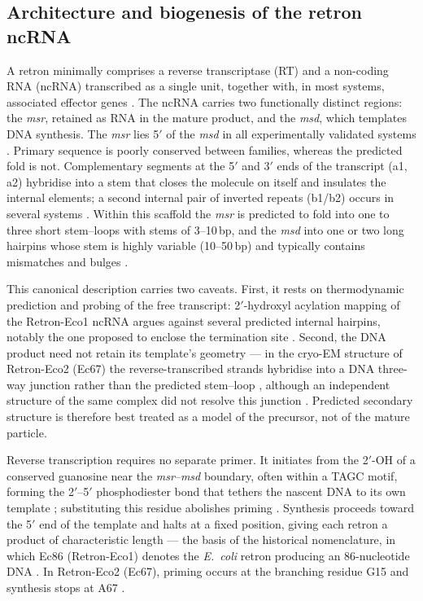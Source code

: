 \subsection{Architecture and biogenesis of the retron ncRNA}

A retron minimally comprises a reverse transcriptase (RT) and a non-coding RNA
(ncRNA) transcribed as a single unit, together with, in most systems, associated
effector genes \cite{simon2019,mestre2020,millman2020}. The ncRNA carries two
functionally distinct regions: the \textit{msr}, retained as RNA in the mature
product, and the \textit{msd}, which templates DNA synthesis. The \textit{msr}
lies 5$'$ of the \textit{msd} in all experimentally validated systems
\cite{lampson1989,simon2019}. Primary sequence is poorly conserved between
families, whereas the predicted fold is not. Complementary segments at the 5$'$
and 3$'$ ends of the transcript (a1, a2) hybridise into a stem that closes the
molecule on itself and insulates the internal elements; a second internal pair of
inverted repeats (b1/b2) occurs in several systems \cite{mestre2020,simon2019}.
Within this scaffold the \textit{msr} is predicted to fold into one to three short
stem--loops with stems of 3--10\,bp, and the \textit{msd} into one or two long
hairpins whose stem is highly variable (10--50\,bp) and typically contains
mismatches and bulges \cite{mestre2020}.

This canonical description carries two caveats. First, it rests on thermodynamic
prediction and probing of the free transcript: 2$'$-hydroxyl acylation mapping of
the Retron-Eco1 ncRNA argues against several predicted internal hairpins, notably
the one proposed to enclose the termination site \cite{palka2022}. Second, the DNA
product need not retain its template's geometry --- in the cryo-EM structure of
Retron-Eco2 (Ec67) the reverse-transcribed strands hybridise into a DNA three-way
junction rather than the predicted stem--loop \cite{jasnauskaite2026}, although an
independent structure of the same complex did not resolve this junction
\cite{wang2025}. Predicted secondary structure is therefore best treated as a
model of the precursor, not of the mature particle.

Reverse transcription requires no separate primer. It initiates from the 2$'$-OH
of a conserved guanosine near the \textit{msr}--\textit{msd} boundary, often within
a TAGC motif, forming the 2$'$--5$'$ phosphodiester bond that tethers the nascent
DNA to its own template \cite{lampson1989,simon2019}; substituting this residue
abolishes priming \cite{hsu1992}. Synthesis proceeds toward the 5$'$ end of the
template and halts at a fixed position, giving each retron a product of
characteristic length --- the basis of the historical nomenclature, in which Ec86
(Retron-Eco1) denotes the \textit{E.~coli} retron producing an 86-nucleotide DNA
\cite{lampson1989,simon2019,millman2020}. In Retron-Eco2 (Ec67), priming occurs at
the branching residue G15 and synthesis stops at A67 \cite{lampson1989}.

